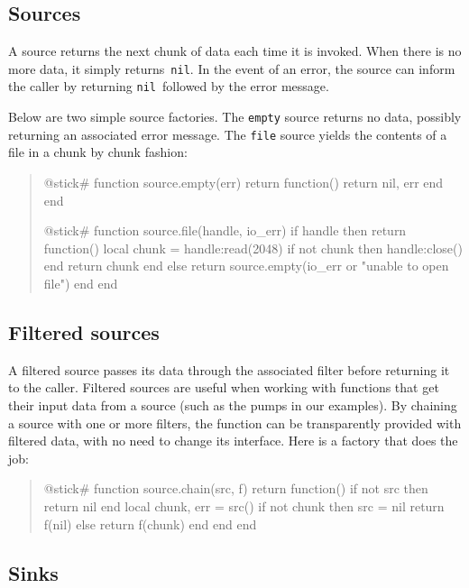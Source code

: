 \documentclass[10pt]{article}
\newcommand{\nil}{\texttt{nil}}
\begin{document}
\subsection{Sources}

A source returns the next chunk of data each time it is
invoked. When there is no more data, it simply returns~\nil.  
In the event of an error, the source can inform the
caller by returning \nil\ followed by the error message.

Below are two simple source factories. The \texttt{empty} source
returns no data, possibly returning an associated error
message. The \texttt{file} source yields the contents of a file 
in a chunk by chunk fashion:
\begin{quote}
\begin{lua}
@stick#
function source.empty(err)
  return function()
    return nil, err
  end
end
%

@stick#
function source.file(handle, io_err)
  if handle then 
    return function()
      local chunk = handle:read(2048)
      if not chunk then handle:close() end
      return chunk
    end
  else return source.empty(io_err or "unable to open file") end
end
%
\end{lua}
\end{quote}

\subsection{Filtered sources}

A filtered source passes its data through the
associated filter before returning it to the caller. 
Filtered sources are useful when working with
functions that get their input data from a source (such as
the pumps in our examples). By chaining a source with one or
more filters, the function can be transparently provided
with filtered data, with no need to change its interface. 
Here is a factory that does the job:
\begin{quote}
\begin{lua}
@stick#
function source.chain(src, f)
  return function()
    if not src then 
      return nil 
    end
    local chunk, err = src()
    if not chunk then 
      src = nil
      return f(nil)
    else 
      return f(chunk) 
    end
  end
end
%
\end{lua}
\end{quote}

\subsection{Sinks}
\end{document}
